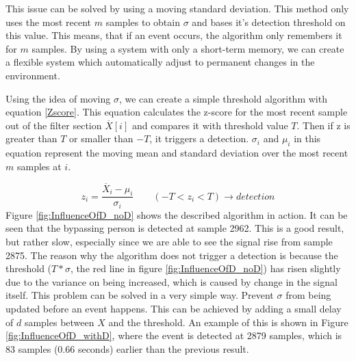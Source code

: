 This issue can be solved by using a moving standard deviation. This method only uses the most recent $m$ samples to obtain $\sigma$ and bases it's detection threshold on this value. This means, that if an event occurs, the algorithm only remembers it for $m$ samples. By using a system with only a short-term memory, we can create a flexible system which automatically adjust to permanent changes in the environment.

Using the idea of moving $\sigma$, we can create a simple threshold algorithm with equation \ref{Zscore}. This equation calculates the z-score for the most recent sample out of the filter section $\overline{X}[i]$ and compares it with threshold value $T$. Then if z is greater than $T$ or smaller than $-T$, it triggers a detection. $\sigma_i$ and $\mu_i$ in this equation represent the moving mean and standard deviation over the most recent $m$ samples at $i$.

\begin{equation}
	\label{Zscore}
	z_i = \frac{\overline{X}_i - \mu_i}{\sigma_i}
	\qquad
	(-T < z_i < T) \rightarrow detection 
\end{equation}
Figure \ref{fig:InfluenceOfD_noD} shows the described algorithm in action. It can be seen that the bypassing person is detected at sample 2962. This is a good result, but rather slow, especially since we are able to see the signal rise from sample 2875. The reason why the algorithm does not trigger a detection is because the threshold ($T * \sigma$, the red line in figure \ref{fig:InfluenceOfD_noD}) has risen slightly due to the variance on being increased, which is caused by change in the signal itself. This problem can be solved in a very simple way. Prevent $\sigma$ from being updated before an event happens. This can be achieved by adding a small delay of $d$ samples between $X$ and the threshold. An example of this is shown in Figure \ref{fig:InfluenceOfD_withD}, where the event is detected at 2879 samples, which is 83 samples (0.66 seconds) earlier than the previous result.


